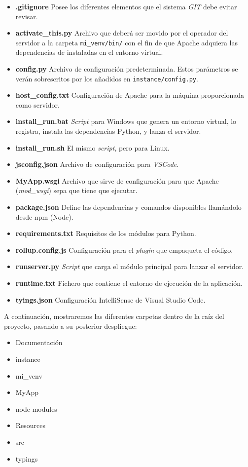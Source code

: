 \begin{itemize}
	\item \textbf{.gitignore} Posee los diferentes elementos que el sistema \textit{GIT} debe evitar revisar.
	\item \textbf{activate\_this.py} Archivo que deberá ser movido por el operador del servidor a la carpeta \texttt{mi\_venv/bin/} con el fin de que Apache adquiera las dependencias de instaladas en el entorno virtual.
	\item \textbf{config.py} Archivo de configuración predeterminada. Estos parámetros se verán sobrescritos por los añadidos en \texttt{instance/config.py}.
	\item \textbf{host\_config.txt} Configuración de Apache para la máquina proporcionada como servidor.
	\item \textbf{install\_run.bat} \textit{Script} para Windows que genera un entorno virtual, lo registra, instala las dependencias Python, y lanza el servidor.
	\item \textbf{install\_run.sh} El mismo \textit{script}, pero para Linux.
	\item \textbf{jsconfig.json} Archivo de configuración para \textit{VSCode}.
	\item \textbf{MyApp.wsgi} Archivo que sirve de configuración para que Apache (\textit{mod\_wsgi}) sepa que tiene que ejecutar.
	\item \textbf{package.json} Define las dependencias y comandos disponibles llamándolo desde npm (Node).
	\item \textbf{requirements.txt} Requisitos de los módulos para Python.
	\item \textbf{rollup.config.js} Configuración para el \textit{plugin} que empaqueta el código.
	\item \textbf{runserver.py} \textit{Script} que carga el módulo principal para lanzar el servidor.
	\item \textbf{runtime.txt} Fichero que contiene el entorno de ejecución de la aplicación.
	\item \textbf{tyings.json} Configuración IntelliSense de Visual Studio Code.
\end{itemize}

A continuación, mostraremos las diferentes carpetas dentro de la raíz del proyecto, pasando a su posterior despliegue:

\begin{itemize}
	\item Documentación
	\item instance
	\item mi\_venv
	\item MyApp
	\item node modules
	\item Resources
	\item src
	\item typings
\end{itemize}

